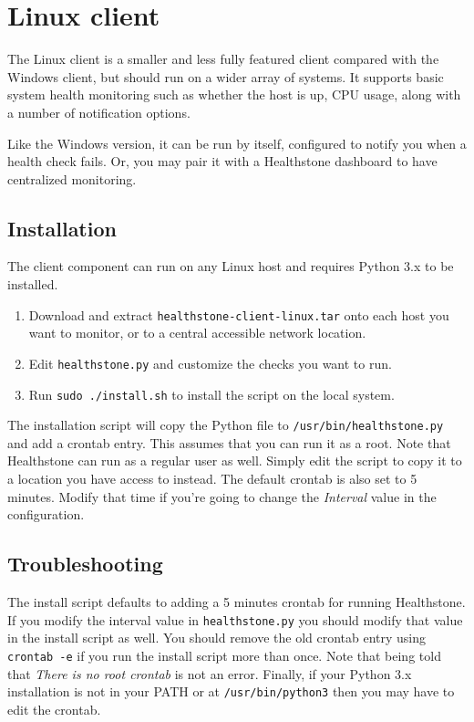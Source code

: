 \documentclass[11pt]{article}
\begin{document}
\section{Linux client}

The Linux client is a smaller and less fully featured client compared with the Windows client, but should run on a wider array of systems. It supports basic system health monitoring such as whether the host is up, CPU usage, along with a number of notification options.

Like the Windows version, it can be run by itself, configured to notify you when a health check fails. Or, you may pair it with a Healthstone dashboard to have centralized monitoring.

\subsection{Installation}

The client component can run on any Linux host and requires Python 3.x to be installed.

\begin{enumerate}
\item Download and extract \texttt{healthstone-client-linux.tar} onto each host you want to monitor, or to a central accessible network location.
\item Edit \texttt{healthstone.py} and customize the checks you want to run.
\item Run \texttt{sudo ./install.sh} to install the script on the local system.
\end{enumerate}

The installation script will copy the Python file to \texttt{/usr/bin/healthstone.py} and add a crontab entry. This assumes that you can run it as a root. Note that Healthstone can run as a regular user as well. Simply edit the script to copy it to a location you have access to instead. The default crontab is also set to 5 minutes. Modify that time if you're going to change the \textit{Interval} value in the configuration.

\subsection{Troubleshooting}

The install script defaults to adding a 5 minutes crontab for running Healthstone. If you modify the interval value in \texttt{healthstone.py} you should modify that value in the install script as well. You should remove the old crontab entry using \texttt{crontab -e} if you run the install script more than once. Note that being told that \textit{There is no root crontab} is not an error. Finally, if your Python 3.x installation is not in your PATH or at \texttt{/usr/bin/python3} then you may have to edit the crontab.
\end{document}
